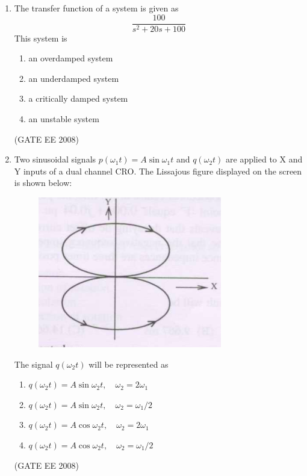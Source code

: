 \documentclass[journal,12pt,onecolumn]{IEEEtran}
\theoremstyle{remark}
\begin{document}
\begin{enumerate}[start=1, label=Q.\arabic*]
\item The transfer function of a system is given as
$$
\frac{100}{s^2+20s+100}
$$
This system is

\begin{multicols}{2}
\begin{enumerate}[label=(\Alph*)]
    \item an overdamped system
    \item an underdamped system
    \item a critically damped system
    \item an unstable system
\end{enumerate}
\end{multicols}
\hfill (GATE EE 2008)




\item Two sinusoidal signals $p(\omega_1 t) = A \sin \omega_1 t$ and $q(\omega_2 t)$ are applied to X and Y inputs of a dual channel CRO. The Lissajous figure displayed on the screen is shown below:

\begin{figure}[H]
    \centering
    \includegraphics[width=0.5\columnwidth]{Fig/q69.png}
\end{figure}

The signal $q(\omega_2 t)$ will be represented as

\begin{multicols}{2}
\begin{enumerate}[label=(\Alph*)]
    \item $q(\omega_2 t) = A \sin \omega_2 t, \quad \omega_2 = 2\omega_1$
    \item $q(\omega_2 t) = A \sin \omega_2 t, \quad \omega_2 = \omega_1/2$
    \item $q(\omega_2 t) = A \cos \omega_2 t, \quad \omega_2 = 2\omega_1$
    \item $q(\omega_2 t) = A \cos \omega_2 t, \quad \omega_2 = \omega_1/2$
\end{enumerate}
\end{multicols}
\hfill (GATE EE 2008)




\end{enumerate}
\end{document}
